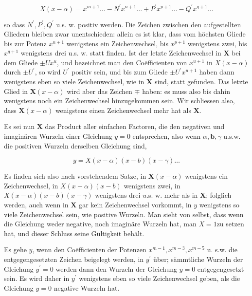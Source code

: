 \documentclass[10pt]{article}
\begin{document}
\[
X(x-\alpha)=x^{m+1} \ldots-N^{\prime} x^{n+1} \ldots+P^{\prime} x^{p+1} \ldots-Q^{\prime} x^{q+1} \ldots
\]

so dass \(N^{\prime}, P^{\prime}, Q^{\prime}\) u.s. w. positiv werden. Die Zeichen zwischen den aufgestellten Gliedern bleiben zwar unentschieden: allein es ist klar, dass vom höchsten Gliede bis zur Potenz \(x^{n+1}\) wenigstens ein Zeichenwechsel, bis \(x^{p+1}\) wenigstens zwei, bis \(x^{q+1}\) wenigstens drei u.s. w. statt finden. Ist der letzte Zeichenwechsel in \(\boldsymbol{X}\) bei dem Gliede \(\pm U x^{u}\), und bezeichnet man den Coëfficienten von \(x^{u+1}\) in \(X(x-\alpha)\) durch \(\pm U^{\prime}\), so wird \(U^{\prime}\) positiv sein, und bis zum Gliede \(\pm U^{\prime} x^{u+1}\) haben dann wenigstens eben so viele Zeichenwechsel, wie in \(\mathbf{X}\) sind, statt gefunden. Das letzte Glied in \(\boldsymbol{X}(x-\alpha)\) wird aber das Zeichen \(\mp\) haben: es muss also bis dahin wenigstens noch ein Zeichenwechsel hinzugekommen sein. Wir schliessen also, dass \(\boldsymbol{X}(x-\alpha)\) wenigstens einen Zeichenwechsel mehr hat als \(\boldsymbol{X}\).

Es sei nun \(\boldsymbol{X}\) das Product aller einfachen Factoren, die den negativen und imaginären Wurzeln einer Gleichung \(y=0\) entsprechen, also wenn \(\alpha, \boldsymbol{b}, \gamma\) u.s.w. die positiven Wurzeln derselben Gleichung sind,

\[
y=X(x-\alpha)(x-b)(x-\gamma) \ldots
\]

Es finden sich also nach vorstehendem Satze, in \(\boldsymbol{X}(x-\alpha)\) wenigstens ein Zeichenwechsel, in \(X(x-\alpha)(x-b)\) wenigstens zwei, in \(X(x-\alpha)(x-b)(x-\gamma)\) wenigstens drei \(u\).s. w. mehr als in \(\boldsymbol{X}\); folglich werden, auch wenn in \(\boldsymbol{X}\) gar kein Zeichenwechsel vorkommt, in \(y\) wenigstens so viele Zeichenwechsel sein, wie positive Wurzeln. Man sieht von selbst, dass wenn die Gleichung weder negative, noch imaginäre Wurzeln hat, man \(X=1 \mathrm{zu}\) setzen hat, und dieser Schluss seine Gültigkeit behält.

Es gehe \(y\), wenn den Coëfficienten der Potenzen \(x^{m-1}, x^{m-3}, x^{m-5}\) u. s.w. die entgegengesetzten Zeichen beigelegt werden, in \(y^{\prime}\) über; sämmtliche Wurzeln der Gleichung \(y^{\prime}=0\) werden dann den Wurzeln der Gleichung \(y=0\) entgegengesetzt sein. Es wird daher in \(y^{\prime}\) wenigstens eben so viele Zeichenwechsel geben, als die Gleichung \(y=0\) negative Wurzeln hat.
\end{document}
